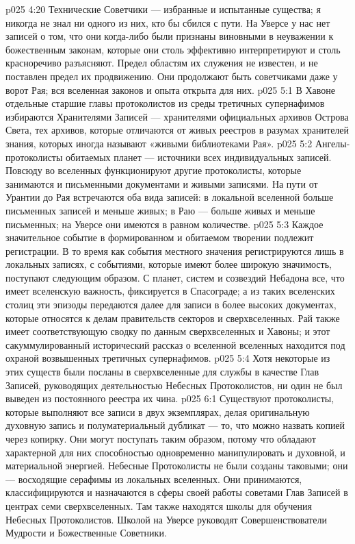 \vs p025 4:20 Технические Советчики --- избранные и испытанные существа; я никогда не знал ни одного из них, кто бы сбился с пути. На Уверсе у нас нет записей о том, что они когда\hyp{}либо были признаны виновными в неуважении к божественным законам, которые они столь эффективно интерпретируют и столь красноречиво разъясняют. Предел областям их служения не известен, и не поставлен предел их продвижению. Они продолжают быть советчиками даже у ворот Рая; вся вселенная законов и опыта открыта для них.
\vs p025 5:1 В Хавоне отдельные старшие главы протоколистов из среды третичных супернафимов избираются Хранителями Записей --- хранителями официальных архивов Острова Света, тех архивов, которые отличаются от живых реестров в разумах хранителей знания, которых иногда называют «живыми библиотеками Рая».
\vs p025 5:2 Ангелы\hyp{}протоколисты обитаемых планет --- источники всех индивидуальных записей. Повсюду во вселенных функционируют другие протоколисты, которые занимаются и письменными документами и живыми записями. На пути от Урантии до Рая встречаются оба вида записей: в локальной вселенной больше письменных записей и меньше живых; в Раю --- больше живых и меньше письменных; на Уверсе они имеются в равном количестве.
\vs p025 5:3 Каждое значительное событие в формированном и обитаемом творении подлежит регистрации. В то время как события местного значения регистрируются лишь в локальных записях, с событиями, которые имеют более широкую значимость, поступают следующим образом. С планет, систем и созвездий Небадона все, что имеет вселенскую важность, фиксируется в Спасограде; а из таких вселенских столиц эти эпизоды передаются далее для записи в более высоких документах, которые относятся к делам правительств секторов и сверхвселенных. Рай также имеет соответствующую сводку по данным сверхвселенных и Хавоны; и этот сакуммулированный исторический рассказ о вселенной вселенных находится под охраной возвышенных третичных супернафимов.
\vs p025 5:4 Хотя некоторые из этих существ были посланы в сверхвселенные для службы в качестве Глав Записей, руководящих деятельностью Небесных Протоколистов, ни один не был выведен из постоянного реестра их чина.
\vs p025 6:1 Существуют протоколисты, которые выполняют все записи в двух экземплярах, делая оригинальную духовную запись и полуматериальный дубликат --- то, что можно назвать копией через копирку. Они могут поступать таким образом, потому что обладают характерной для них способностью одновременно манипулировать и духовной, и материальной энергией. Небесные Протоколисты не были созданы таковыми; они --- восходящие серафимы из локальных вселенных. Они принимаются, классифицируются и назначаются в сферы своей работы советами Глав Записей в центрах семи сверхвселенных. Там также находятся школы для обучения Небесных Протоколистов. Школой на Уверсе руководят Совершенствователи Мудрости и Божественные Советники.
